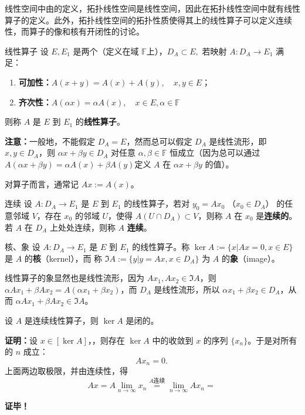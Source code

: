 
线性空间中由的定义，拓扑线性空间是线性空间，因此在拓扑线性空间中就有线性算子的定义。此外，拓扑线性空间的拓扑性质使得其上的线性算子可以定义连续性，而算子的像和核有开闭性的讨论。

\begin{definition}{线性算子}
设 $E,E_1$ 是两个（定义在域 $\mathbb F$上），$D_A\subset E,$ 若映射 $A:D_A\rightarrow E_1$ 满足：
\begin{enumerate}
\item \textbf{可加性：}$A(x+y)=A(x)+A(y),\quad x,y\in E$；
\item \textbf{齐次性：}$A(\alpha x)=\alpha A(x),\quad x\in E,\alpha\in \mathbb F$
\end{enumerate}
则称 $A$ 是 $E$ 到 $E_1$ 的\textbf{线性算子}。
  
\end{definition}

\textbf{注意：}一般地，不能假定 $D_A=E$，然而总可以假定 $D_A$ 是线性流形，即 $x,y\in D_A$，则 $\alpha x+\beta y\in D_A$ 对任意 $\alpha,\beta\in\mathbb F$ 恒成立（因为总可以通过 $A(\alpha x+\beta y)=\alpha A(x)+\beta A(y)$定义 $A$ 在 $\alpha x+\beta y$ 的值）。

对算子而言，通常记 $Ax:=A(x)$。

\begin{definition}{连续}
设 $A:D_A\rightarrow E_1$ 是 $E$ 到 $E_1$ 的线性算子，若对 $y_0=Ax_0$ （$x_0\in D_A$） 的任意邻域 $V$，存在 $x_0$ 的邻域 $U$，使得 $A(U\cap D_A)\subset V$，则称 $A$ 在 $x_0$ 是\textbf{连续的}。若 $A$ 在 $D_A$ 上处处连续，则称 $A$ \textbf{连续}。
\end{definition}


\begin{definition}{核、象}
设 $A:D_A\rightarrow E_1$ 是 $E$ 到 $E_1$ 的线性算子。称 $\ker A:=\{x|Ax=0,x\in E\}$ 是 $A$ 的\textbf{核}（kernel），而 称 $\Im A:=\{y|y=Ax,x\in D_A\}$ 为 $A$ 的\textbf{象}（image）。 
\end{definition}

线性算子的象显然也是线性流形，因为 $Ax_1,Ax_2\in \Im A$，则 $\alpha Ax_1+\beta Ax_2=A(\alpha x_1+\beta x_2)$，而 $D_A$ 是线性流形，所以 $\alpha x_1+\beta x_2\in D_A$，从而 $\alpha Ax_1+\beta Ax_2\in\Im A$。 

\begin{theorem}{}
设 $A$ 是连续线性算子，则 $\ker A$ 是闭的。
\end{theorem}
\textbf{证明：}设 $x\in[\ker A]$，，则存在 $\ker A$ 中的收敛到 $x$ 的序列 $\{x_n\}$。于是对所有的 $n$ 成立：
\begin{equation}
Ax_n=0.~
\end{equation}
 上面两边取极限，并由连续性，得 \begin{equation}
 Ax=A\lim_{n\rightarrow\infty}x_n\overset{A\text{连续}}{=}\lim_{n\rightarrow\infty}A x_n=~
 \end{equation}
 



\textbf{证毕！}






